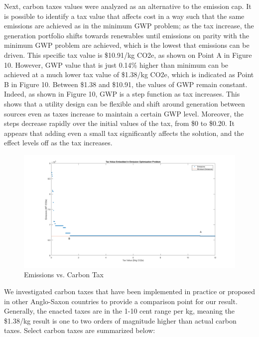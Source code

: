 \documentclass{article}
\begin{document}
	Next, carbon taxes values were analyzed as an alternative to the emission cap. It is possible to identify a tax value that affects cost in a way such that the same emissions are achieved as in the minimum GWP problem; as the tax increase, the generation portfolio shifts towards renewables until emissions on parity with the minimum GWP problem are achieved, which is the lowest that emissions can be driven. This specific tax value is \$10.91/kg CO2e, as shown on Point A in Figure 10. However, GWP value that is just 0.14\% higher than minimum can be achieved at a much lower tax value of \$1.38/kg CO2e, which is indicated as Point B in Figure 10. Between \$1.38 and \$10.91, the values of GWP remain constant. Indeed, as shown in Figure 10, GWP is a step function as tax increases. This shows that a utility design can be flexible and shift around generation between sources even as taxes increase to maintain a certain GWP level. Moreover, the steps decrease rapidly over the initial values of the tax, from \$0 to \$0.20. It appears that adding even a small tax significantly affects the solution, and the effect levels off as the tax increases.
	
	\begin{figure}
		\includegraphics[width=\textwidth]{432_10_tax_vs_minemissions}
		\caption{Emissions vs. Carbon Tax}
	\end{figure}
	
	We investigated carbon taxes that have been implemented in practice or proposed in other Anglo-Saxon countries to provide a comparison point for our result. Generally, the enacted taxes are in the 1-10 cent range per kg, meaning the \$1.38/kg result is one to two orders of magnitude higher than actual carbon taxes. Select carbon taxes are summarized below:
	
\end{document}
